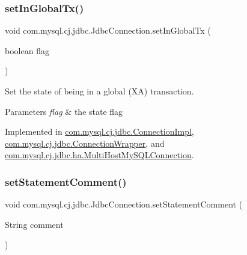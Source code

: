 \mbox{\label{interfacecom_1_1mysql_1_1cj_1_1jdbc_1_1_jdbc_connection_af7cff3ba67d2b787b04c3eff40f9e087}} 
\subsubsection{\texorpdfstring{set\+In\+Global\+Tx()}{setInGlobalTx()}}
{\footnotesize\ttfamily void com.\+mysql.\+cj.\+jdbc.\+Jdbc\+Connection.\+set\+In\+Global\+Tx (\begin{DoxyParamCaption}\item[{boolean}]{flag }\end{DoxyParamCaption})}

Set the state of being in a global (XA) transaction.


\begin{DoxyParams}{Parameters}
{\em flag} & the state flag \\
\hline
\end{DoxyParams}


Implemented in \mbox{\hyperlink{classcom_1_1mysql_1_1cj_1_1jdbc_1_1_connection_impl_a70a08ce7c0dea524a32a245986fb1531}{com.\+mysql.\+cj.\+jdbc.\+Connection\+Impl}}, \mbox{\hyperlink{classcom_1_1mysql_1_1cj_1_1jdbc_1_1_connection_wrapper_adb320c4558060ee9dae32dc4d4310beb}{com.\+mysql.\+cj.\+jdbc.\+Connection\+Wrapper}}, and \mbox{\hyperlink{classcom_1_1mysql_1_1cj_1_1jdbc_1_1ha_1_1_multi_host_my_s_q_l_connection_a317920d3dc1f80c789676ad3391135bc}{com.\+mysql.\+cj.\+jdbc.\+ha.\+Multi\+Host\+My\+S\+Q\+L\+Connection}}.

\mbox{\label{interfacecom_1_1mysql_1_1cj_1_1jdbc_1_1_jdbc_connection_adfbd59fbebd013673ed3eb97beb76179}} 
\subsubsection{\texorpdfstring{set\+Statement\+Comment()}{setStatementComment()}}
{\footnotesize\ttfamily void com.\+mysql.\+cj.\+jdbc.\+Jdbc\+Connection.\+set\+Statement\+Comment (\begin{DoxyParamCaption}\item[{String}]{comment }\end{DoxyParamCaption})}

